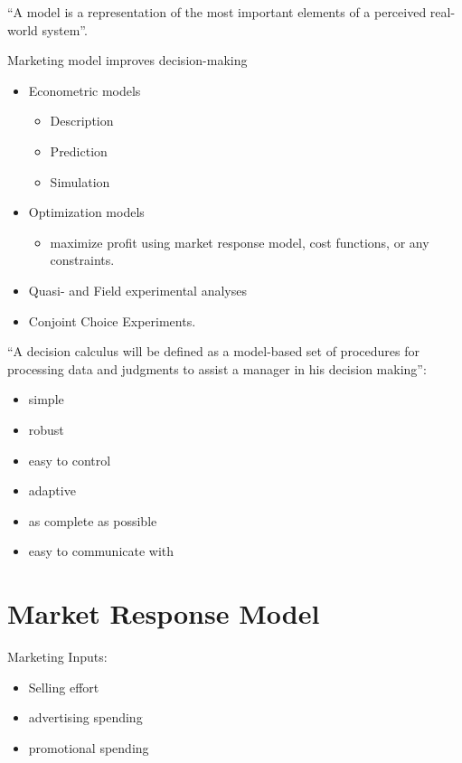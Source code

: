\documentclass[
]{book}
\providecommand{\tightlist}{%
  \setlength{\itemsep}{0pt}\setlength{\parskip}{0pt}}
\begin{document}
``A model is a representation of the most important elements of a perceived real-world system''.

Marketing model improves decision-making

\begin{itemize}
\item
  Econometric models

  \begin{itemize}
  \tightlist
  \item
    Description
  \item
    Prediction
  \item
    Simulation
  \end{itemize}
\item
  Optimization models

  \begin{itemize}
  \tightlist
  \item
    maximize profit using market response model, cost functions, or any constraints.
  \end{itemize}
\item
  Quasi- and Field experimental analyses
\item
  Conjoint Choice Experiments.
\end{itemize}

``A decision calculus will be defined as a model-based set of procedures for processing data and judgments to assist a
manager in his decision making''\citep{Little_1976}:

\begin{itemize}
\tightlist
\item
  simple
\item
  robust
\item
  easy to control
\item
  adaptive
\item
  as complete as possible
\item
  easy to communicate with
\end{itemize}

\hypertarget{market-response-model}{%
\section{Market Response Model}\label{market-response-model}}

Marketing Inputs:

\begin{itemize}
\tightlist
\item
  Selling effort
\item
  advertising spending
\item
  promotional spending
\end{itemize}
\end{document}

